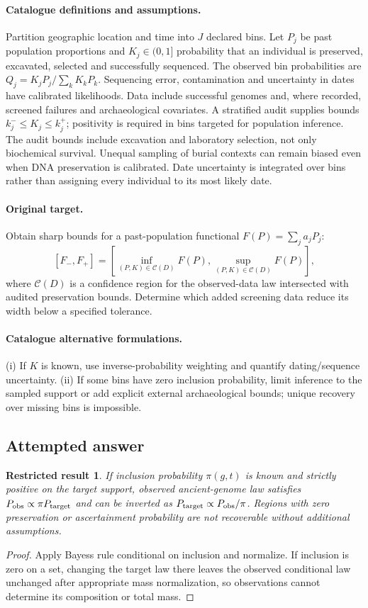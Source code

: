 \documentclass[11pt]{article}
\newtheorem{attemptresult}{Restricted result}[section]
\begin{document}
\paragraph{Catalogue definitions and assumptions.}
Partition geographic location and time into $J$ declared bins. Let $P_j$ be past population proportions and $K_j\in(0,1]$ probability that an individual is preserved, excavated, selected and successfully sequenced. The observed bin probabilities are $Q_j=K_jP_j/\sum_kK_kP_k$. Sequencing error, contamination and uncertainty in dates have calibrated likelihoods. Data include successful genomes and, where recorded, screened failures and archaeological covariates. A stratified audit supplies bounds $k_j^-\le K_j\le k_j^+$; positivity is required in bins targeted for population inference. The audit bounds include excavation and laboratory selection, not only biochemical survival. Unequal sampling of burial contexts can remain biased even when DNA preservation is calibrated. Date uncertainty is integrated over bins rather than assigning every individual to its most likely date.
\paragraph{Original target.}
Obtain sharp bounds for a past-population functional $F(P)=\sum_j a_jP_j$:
\[
 [F_-,F_+]=
 \left[\inf_{(P,K)\in\mathcal C(D)}F(P),
       \sup_{(P,K)\in\mathcal C(D)}F(P)\right],
\]
where $\mathcal C(D)$ is a confidence region for the observed-data law intersected with audited preservation bounds. Determine which added screening data reduce its width below a specified tolerance.
\paragraph{Catalogue alternative formulations.}
(i) If $K$ is known, use inverse-probability weighting and quantify dating/sequence uncertainty. (ii) If some bins have zero inclusion probability, limit inference to the sampled support or add explicit external archaeological bounds; unique recovery over missing bins is impossible.
\subsection{Attempted answer}
\begin{attemptresult}
If inclusion probability $\pi(g,t)$ is known and strictly positive on the target support, observed ancient-genome law satisfies $P_{\rm obs}\propto\pi P_{\rm target}$ and can be inverted as $P_{\rm target}\propto P_{\rm obs}/\pi$. Regions with zero preservation or ascertainment probability are not recoverable without additional assumptions.
\end{attemptresult}
\begin{proof}
Apply Bayes\textquotesingle s rule conditional on inclusion and normalize. If inclusion is zero on a set, changing the target law there leaves the observed conditional law unchanged after appropriate mass normalization, so observations cannot determine its composition or total mass.
\end{proof}
\end{document}
